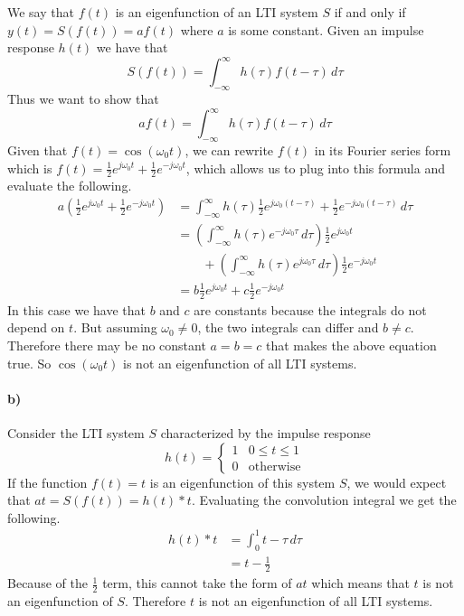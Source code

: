 \documentclass[12pt]{article}
\begin{document}
We say that \(f(t)\) is an eigenfunction of an LTI system \(S\) if and only if \(y(t)=S(f(t))=af(t)\) where \(a\) is some constant. Given an impulse
response \(h(t)\) we have that
\[S(f(t)) = \int_{-\infty}^{\infty} h(\tau)f(t-\tau)\, d\tau\]
Thus we want to show that
\[af(t) = \int_{-\infty}^{\infty} h(\tau)f(t-\tau)\, d\tau\]
Given that \(f(t)=\cos(\omega_0 t)\), we can rewrite \(f(t)\) in its Fourier series form which is \(f(t)=\frac{1}{2}e^{j\omega_0 t} + \frac{1}{2}e^{-j\omega_0 t}\),
which allows us to plug into this formula and evaluate the following.
\begin{align*}
    a\left(\frac{1}{2}e^{j\omega_0 t} + \frac{1}{2}e^{-j\omega_0 t}\right)
    &=\int_{-\infty}^{\infty} h(\tau)\frac{1}{2}e^{j\omega_0 (t-\tau)} + \frac{1}{2}e^{-j\omega_0 (t-\tau)}\, d\tau\\
    &=\left(\int_{-\infty}^{\infty} h(\tau)e^{-j\omega_0\tau}\, d\tau\right)\frac{1}{2}e^{j\omega_0 t}\\
    &\qquad+\left(\int_{-\infty}^{\infty} h(\tau)e^{j\omega_0\tau}\, d\tau\right)\frac{1}{2}e^{-j\omega_0 t}\\
    &=b\frac{1}{2}e^{j\omega_0 t}+c\frac{1}{2}e^{-j\omega_0 t}
\end{align*}
In this case we have that \(b\) and \(c\) are constants because the integrals do not depend on \(t\). But assuming \(\omega_0 \neq 0\), the two integrals can differ and \(b\neq c\).
Therefore there may be no constant \(a=b=c\) that makes the above equation true. So \(\cos(\omega_0 t)\) is not an eigenfunction of all LTI systems.

\paragraph{b)}

Consider the LTI system \(S\) characterized by the impulse response
\[h(t)=
    \begin{cases}
        1 & 0\leq t \leq 1\\
        0 & \text{otherwise}
    \end{cases}
\]
If the function \(f(t)=t\) is an eigenfunction of this system \(S\), we would expect that \(at=S(f(t))=h(t)*t\). Evaluating the convolution integral we get the following.
\begin{align*}
    h(t)*t&=\int_0^1 t-\tau\, d\tau\\
    &=t-\frac{1}{2}
\end{align*}
Because of the \(\frac{1}{2}\) term, this cannot take the form of \(at\) which means that \(t\) is not an eigenfunction of \(S\). Therefore \(t\) is not an eigenfunction of all LTI systems.
\end{document}
